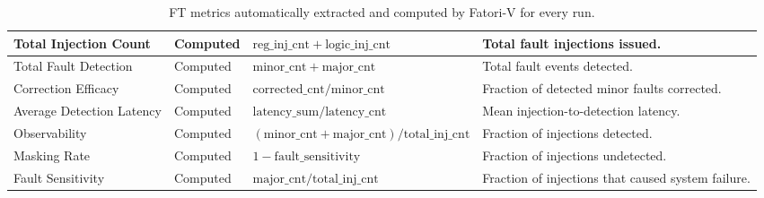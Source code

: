 \begin{table}[h]
\begin{tabularx}{\textwidth}{|p{}|p{}|X|X|}
Total Injection Count &
Computed &
\(\mathrm{reg\_inj\_cnt} + \mathrm{logic\_inj\_cnt}\) &
Total fault injections issued. \\
\hline
Total Fault Detection &
Computed &
\(\mathrm{minor\_cnt} + \mathrm{major\_cnt}\) &
Total fault events detected. \\
\hline
Correction Efficacy &
Computed &
\(\mathrm{corrected\_cnt}/\mathrm{minor\_cnt}\) &
Fraction of detected minor faults corrected. \\
\hline
Average Detection Latency &
Computed &
\(\mathrm{latency\_sum}/\mathrm{latency\_cnt}\) &
Mean injection-to-detection latency. \\
\hline
Observability &
Computed &
\((\mathrm{minor\_cnt} + \mathrm{major\_cnt})/\mathrm{total\_inj\_cnt}\) &
Fraction of injections detected. \\
\hline
Masking Rate &
Computed &
\(1 - \mathrm{fault\_sensitivity}\) &
Fraction of injections undetected. \\
\hline
Fault Sensitivity &
Computed &
\(\mathrm{major\_cnt}/\mathrm{total\_inj\_cnt}\) &
Fraction of injections that caused system failure. \\
\hline
\end{tabularx}
\caption{\ac{FT} metrics automatically extracted and computed by \ac{Fatori-V} for every run.}
\label{tab:metrics_ft}
\end{table}